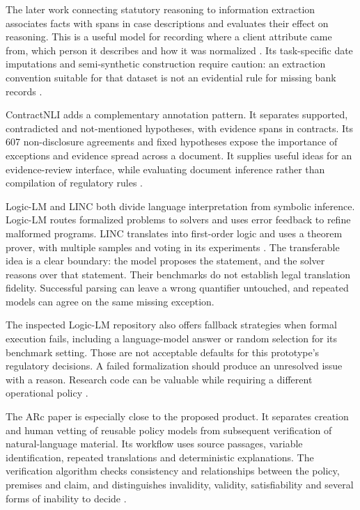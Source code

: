 The later work connecting statutory reasoning to information extraction associates
facts with spans in case descriptions and evaluates their effect on reasoning.
This is a useful model for recording where a client attribute came from, which
person it describes and how it was normalized
\citep[secs.~3--5]{connecting2023}. Its task-specific date imputations and
semi-synthetic construction require caution: an extraction convention suitable
for that dataset is not an evidential rule for missing bank records
\citep[sec.~7 and apps.~B, E]{connecting2023}.

ContractNLI adds a complementary annotation pattern. It separates supported,
contradicted and not-mentioned hypotheses, with evidence spans in contracts.
Its 607 non-disclosure agreements and fixed hypotheses expose the importance of
exceptions and evidence spread across a document. It supplies useful ideas for
an evidence-review interface, while evaluating document inference rather than
compilation of regulatory rules \citep[secs.~2--5]{contractnli2021}.

Logic-LM and LINC both divide language interpretation from symbolic inference.
Logic-LM routes formalized problems to solvers and uses error feedback to refine
malformed programs. LINC translates into first-order logic and uses a theorem
prover, with multiple samples and voting in its experiments
\citep[sec.~3]{logiclm2023} \citep[secs.~2--5]{linc2023}. The transferable idea is a
clear boundary: the model proposes the statement, and the solver reasons over
that statement. Their benchmarks do not establish legal translation fidelity.
Successful parsing can leave a wrong quantifier untouched, and repeated models
can agree on the same missing exception.

The inspected Logic-LM repository also offers fallback strategies when formal
execution fails, including a language-model answer or random selection for its
benchmark setting. Those are not acceptable defaults for this prototype's
regulatory decisions. A failed formalization should produce an unresolved issue
with a reason. Research code can be valuable while requiring a different
operational policy \citep{libraryreview}.

The ARc paper is especially close to the proposed product. It separates creation
and human vetting of reusable policy models from subsequent verification of
natural-language material. Its workflow uses source passages, variable
identification, repeated translations and deterministic explanations. The
verification algorithm checks consistency and relationships between the policy,
premises and claim, and distinguishes invalidity, validity, satisfiability and
several forms of inability to decide
\citep[sec.~3 and Algorithm~1]{arc2025}.

